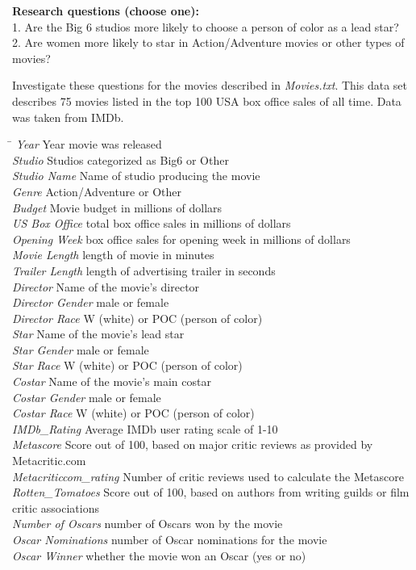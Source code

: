 \textbf{Research questions (choose one):}\\
1. Are the Big 6 studios more likely to choose a person of color as a lead star? \\
2. Are women more likely to star in Action/Adventure movies or other types of movies?

Investigate these questions for the movies described in \emph{Movies.txt}. This data set describes 75 movies listed in the top 100 USA box office sales of all time. Data was taken from IMDb.
\begin{tabbing}
\hspace*{1.5in}\=\kill
\emph{Year}\> Year movie was released\\
\emph{Studio}\> Studios categorized as Big6 or Other \\
\emph{Studio Name}\> Name of studio producing the movie\\
\emph{Genre}\> Action/Adventure or Other\\
\emph{Budget}\> Movie budget in millions of dollars\\
\emph{US Box Office}\> total box office sales in millions of dollars\\
\emph{Opening Week}\> box office sales for opening week in millions of dollars\\
\emph{Movie Length}\> length of movie in minutes\\
\emph{Trailer Length}\> length of advertising trailer in seconds\\
\emph{Director}\> Name of the movie's director\\
\emph{Director Gender}\> male or female\\
\emph{Director Race}\> W (white) or POC (person of color)\\
\emph{Star}\> Name of the movie's lead star\\
\emph{Star Gender}\> male or female\\
\emph{Star Race}\> W (white) or POC (person of color) \\
\emph{Costar}\> Name of the movie's main costar\\
\emph{Costar Gender}\> male or female\\
\emph{Costar Race}\> W (white) or POC (person of color)\\
\emph{IMDb\_Rating}\> Average IMDb user rating scale of 1-10\\
\emph{Metascore}\> Score out of 100, based on major critic reviews as provided by Metacritic.com\\
\emph{Metacriticcom\_rating}\> Number of critic reviews used to calculate the Metascore\\
\emph{Rotten\_Tomatoes}\> Score out of 100, based on authors from writing guilds or film critic associations\\
\emph{Number of Oscars}\> number of Oscars won by the movie\\
\emph{Oscar Nominations}\> number of Oscar nominations for the movie\\
\emph{Oscar Winner}\> whether the movie won an Oscar (yes or no)
\end{tabbing}

